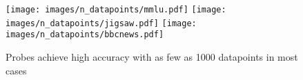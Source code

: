 \begin{figure}[h]
    \centering
    \texttt{[image: images/n\_datapoints/mmlu.pdf]} \texttt{[image: images/n\_datapoints/jigsaw.pdf]}
    \texttt{[image: images/n\_datapoints/bbcnews.pdf]}
    \caption{Probes achieve high accuracy with as few as 1000 datapoints in most cases}
    \label{fig:n_datapoints}
\end{figure}